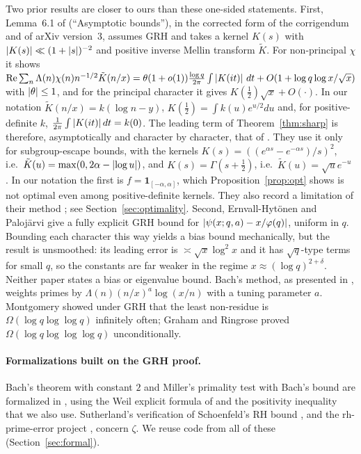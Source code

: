 Two prior results are closer to ours than these one-sided statements. First, Lemma~6.1 of \cite{lls2015}
(``Asymptotic bounds''), in the corrected form of the corrigendum \cite{llscorr2017} and of arXiv version~3, assumes GRH and takes a kernel $K(s)$ with $\left\lvert K(s) \right\rvert\ll(1+\left\lvert s \right\rvert)^{-2}$ and
positive inverse Mellin transform $\tilde K$. For non-principal $\chi$ it shows
$\operatorname{Re}\sum_n\Lambda(n)\chi(n)n^{-1/2}\tilde K(n/x)=\theta(1+o(1))\frac{\log q}{2\pi}\int\left\lvert K(it) \right\rvert\,dt+O(1+\log q\log x/\sqrt x)$
with $\left\lvert \theta \right\rvert\le1$, and for the principal character it gives $K(\frac12)\sqrt x+O(\cdot)$. In our notation $\tilde K(n/x)=k(\log n-y)$,
$K(\frac12)=\int k(u)e^{u/2}du$ and, for positive-definite $k$, $\frac1{2\pi}\int\left\lvert K(it) \right\rvert dt=k(0)$. The leading term of
Theorem~\ref{thm:sharp} is therefore, asymptotically and character by character, that of \cite[Lemma~6.1]{lls2015}.
They use it only for subgroup-escape bounds, with the kernels $K(s)=((e^{\alpha s}-e^{-\alpha s})/s)^2$, i.e.\
$\tilde K(u)=\max(0,2\alpha-\left\lvert \log u \right\rvert)$, and $K(s)=\Gamma(s+\frac12)$, i.e.\ $\tilde K(u)=\sqrt ue^{-u}$ \cite[\S\S6.2--6.3]{lls2015}. In our
notation the first is $f=\mathbf 1_{[-\alpha,\alpha]}$, which Proposition~\ref{prop:opt} shows is not optimal even among positive-definite
kernels. They also record a limitation of their method \cite[\S6.1]{lls2015}; see Section~\ref{sec:optimality}. Second, Ernvall-Hyt\"onen and Paloj\"arvi \cite{ehp2022} give a fully
explicit GRH bound for $\left\lvert \psi(x;q,a)-x/\varphi(q) \right\rvert$, uniform in $q$. Bounding each character this way yields a bias bound
mechanically, but the result is unsmoothed: its leading error is $\asymp\sqrt x\log^2x$ and it has $\sqrt q$-type terms for small $q$, so
the constants are far weaker in the regime $x\approx(\log q)^{2+\delta}$. Neither paper states a bias or eigenvalue bound. Bach's
method, as presented in \cite{mcgowntrevino2021}, weights primes by $\Lambda(n)(n/x)^a\log(x/n)$ with a tuning parameter $a$. Montgomery \cite{montgomery1971} showed under GRH that the least
non-residue is $\Omega(\log q\log\log q)$ infinitely often; Graham and Ringrose \cite{grahamringrose1990}
proved $\Omega(\log q\log\log\log q)$ unconditionally.

\paragraph{Formalizations built on the GRH proof.}
Bach's theorem with constant $2$ and Miller's primality test with Bach's bound are formalized in
\cite{grhmiller}, using the Weil explicit formula of \cite{zeta23} and the positivity inequality that we
also use. Sutherland's verification of Schoenfeld's RH bound \cite{schoenfeldlean}, and the
rh-prime-error project \cite{rhprimeerror}, concern $\zeta$. We reuse code from all of these
(Section~\ref{sec:formal}).

